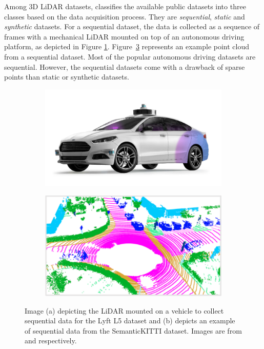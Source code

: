     Among 3D LiDAR datasets, \cite{survey3d} classifies the available public datasets into three classes based on the data acquisition process.
    They are \textit{sequential}, \textit{static} and \textit{synthetic} datasets.
    For a sequential dataset, the data is collected as a sequence of frames with a mechanical LiDAR mounted on top of an autonomous driving platform, as depicted in Figure \ref{fig:seq_data_lyft}.
    Figure~\ref{fig:example_sequential} represents an example point cloud from a sequential dataset.
    Most of the popular autonomous driving datasets are sequential. However, the sequential datasets come with a drawback of sparse points than static or synthetic datasets.
    \begin{figure}[h!]
        \begin{subfigure}{0.45\textwidth}
            \centering
            \includegraphics[scale=0.25]{images/sequential_lyft.png}
            \caption{}
            \label{fig:seq_data_lyft}
        \end{subfigure}
        \begin{subfigure}{0.45\textwidth}
            \centering
            \includegraphics[scale=0.45]{images/SemanticKitti.pdf}
            \caption{}
            \label{fig:example_sequential}
        \end{subfigure}
        \caption{Image (a) depicting the LiDAR mounted on a vehicle to collect sequential data for the Lyft L5 dataset and 
        (b) depicts an example of sequential data from the SemanticKITTI dataset. Images are from \cite{Lyftl5} and \cite{Hu_2020_CVPR_Randla} respectively.}
    \end{figure}
    
